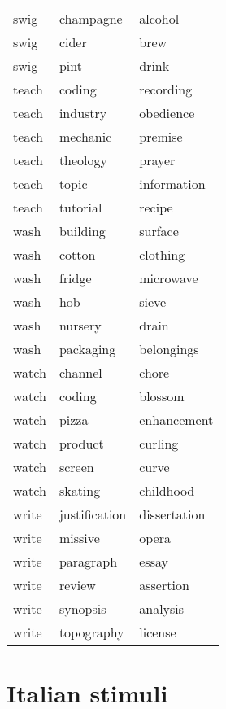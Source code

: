 \begin{longtable}{l|ll}
swig      & champagne      & alcohol      \\
swig      & cider          & brew         \\
swig      & pint           & drink        \\
teach     & coding         & recording    \\
teach     & industry       & obedience    \\
teach     & mechanic       & premise      \\
teach     & theology       & prayer       \\
teach     & topic          & information  \\
teach     & tutorial       & recipe       \\
wash      & building       & surface      \\
wash      & cotton         & clothing     \\
wash      & fridge         & microwave    \\
wash      & hob            & sieve        \\
wash      & nursery        & drain        \\
wash      & packaging      & belongings   \\
watch     & channel        & chore        \\
watch     & coding         & blossom      \\
watch     & pizza          & enhancement  \\
watch     & product        & curling      \\
watch     & screen         & curve        \\
watch     & skating        & childhood    \\
write     & justification  & dissertation \\
write     & missive        & opera        \\
write     & paragraph      & essay        \\
write     & review         & assertion    \\
write     & synopsis       & analysis     \\
write     & topography     & license     
\end{longtable}

\section{Italian stimuli}


